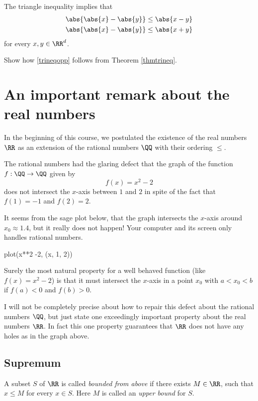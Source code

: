 \documentclass{article}
\begin{document}
The triangle inequality implies that
\begin{align}\label{trineqopp}
  \abs{\abs{x}-\abs{y}} &\leq \abs{x - y}\\
  \abs{\abs{x}-\abs{y}} &\leq \abs{x + y}
\end{align}
for every $x, y\in \RR^d$.

\beginshex
  Show how \eqref{trineqopp} follows from Theorem \ref{thmtrineq}. 
\endshex

\section{An important remark about the real numbers}

In the beginning of this course, we postulated the existence of the real
numbers $\RR$ as an extension of the rational numbers $\QQ$ with their ordering $\leq$.

The rational numbers had the glaring defect that the graph of the function $f:\QQ\rightarrow \QQ$ given by
$$
f(x) = x^2 - 2
$$
does not intersect the $x$-axis between $1$ and $2$ in spite of the
fact that $f(1) = -1$ and $f(2) = 2$.


It seems from the sage plot below, that the graph intersects the
$x$-axis around $x_0\approx 1.4$, but it really does not happen!
Your computer and its screen only
handles rational numbers.

\begin{sage}
  plot(x**2 -2, (x, 1, 2))
\end{sage}

Surely the most natural property for a well behaved function
(like $f(x) = x^2 - 2$) is that it must intersect the $x$-axis
in a point $x_0$ with $a < x_0 < b$ if $f(a) < 0$ and $f(b) > 0$.

I will not be completely precise about how to repair this defect about the
rational numbers $\QQ$, but
just state one exceedingly important property about the real numbers $\RR$. In fact this
one property guarantees that $\RR$ does not have any holes
as in the graph above.

\subsection{Supremum}

A subset $S$ of $\RR$ is called \emph{bounded from above} if there exists
$M\in \RR$, such that $x\leq M$ for every $x\in S$. Here $M$ is
called an \emph{upper bound} for $S$.
\end{document}
